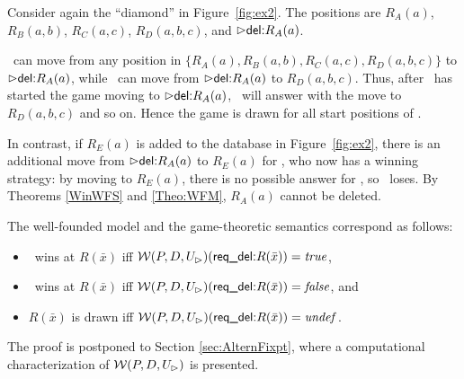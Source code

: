 \documentclass[twoside,11pt]{article}
\theoremstyle{lines}
\theoremstyle{longplain}
\def\rdel{\itorsf{req\_del:}}
\begin{document}
\begin{Example}
  Consider again the ``diamond'' in Figure~\ref{fig:ex2}.  The
  positions are $R_A(a)$, $R_B(a,b)$, $R_C(a,c)$, $R_D(a,b,c)$, and
  $\extev \del R_A(a)$.  

  \I\ can move from any position in $\{R_A(a), R_B(a,b), R_C(a,c),
  R_D(a,b,c)\}$ to $\extev \del R_A(a)$, while \II\ can move from
  $\extev \del R_A(a)$ to $R_D(a,b,c)$. Thus, after \I\ has started
  the game moving to $\extev \del R_A(a)$, \II\ will answer with the
  move to $R_D(a,b,c)$ and so on. Hence the game is drawn for
  all start positions of \I.

  In contrast, if $R_E(a)$ is added to the database in
  Figure~\ref{fig:ex2}, there is an additional move from $\extev \del
  R_A(a)$ to $R_E(a)$ for \II, who now has a winning strategy: by
  moving to $R_E(a)$, there is no possible answer for \I, so \I\ 
  loses. By Theorems \ref{WinWFS} and \ref{Theo:WFM}, $R_A(a)$ cannot
  be deleted.
\end{Example}

\begin{Theorem}\label{WinWFS}
The well-founded model and the game-theoretic semantics correspond as
follows:
  \begin{itemize}
  \item \I\ wins at $R(\bar x)$ iff
     $\pl W(P,D,U_\rhd)(\rdel R(\bar x)) = \true $,
  \item \II\ wins at $R(\bar x)$ iff
     $\pl W(P,D,U_\rhd)(\rdel R(\bar x)) = \false$, and
  \item $R(\bar x)$ is drawn iff
     $\pl W(P,D,U_\rhd) (\rdel R(\bar x)) = \undef$.
  \end{itemize}
\end{Theorem}
The proof is postponed to Section \ref{sec:AlternFixpt}, where a
computational characterization of $\mathcal W(P,D,U_\rhd)$ is presented.
\end{document}
